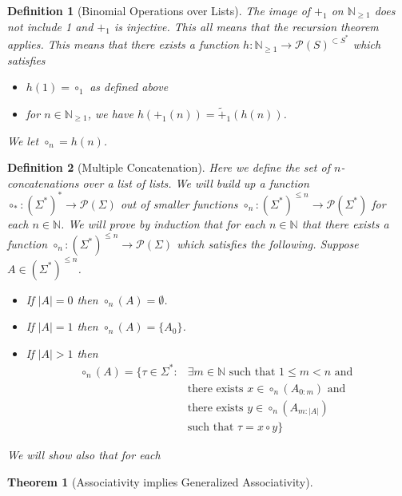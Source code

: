 \documentclass[12pt]{article}
\theoremstyle{break}
\newtheorem{definition}{Definition}[section]
\theoremstyle{break}
\newtheorem{theorem}{Theorem}[section]
\theoremstyle{break}
\theoremstyle{break}
\theoremstyle{break}
\newtheorem{informal definition}[definition]{Informal Definition}
\theoremstyle{break}
\newtheorem{informal theorem}[theorem]{Informal Theorem}
\newcommand{\mc}[1]{\mathcal{#1}}
\newcommand{\natnum}[0]{\mathbb{N}}
\begin{document}
\begin{definition}[Binomial Operations over Lists]
		The image of $+_1$ on $\mathbb{N}_{\ge 1}$ does not include 1 and $+_1$ is injective.
		This all means that the recursion theorem applies.
		This means that there exists a function $h: \mathbb{N}_{\ge 1} \to \mathcal{P}(S)^{\subset S^*}$ which satisfies
		\begin{itemize}
			\item{$h(1) = \circ_1$ as defined above}
			\item{for $n \in \mathbb{N}_{\ge 1}$, we have $h(+_1(n)) = \tilde{+}_1(h(n))$.}
		\end{itemize}
		
		We let $\circ_n = h(n)$.
		
	\end{definition}
	
	\begin{definition}[Multiple Concatenation]
		Here we define the set of $n$-concatenations over a list of lists.
		We will build up a function $\circ_*:(\Sigma^*)^* \to \mc{P}(\Sigma)$ out of smaller functions $\circ_n:(\Sigma^*)^{\le n} \to \mc{P}(\Sigma^*)$ for each $n \in \natnum$.
		We will prove by induction that for each $n\in \natnum$ that there exists a function $\circ_n:(\Sigma^*)^{\le n} \to \mc{P}(\Sigma)$ which satisfies the following.
		Suppose $A \in (\Sigma^*)^{\le n}$.
		
		\begin{itemize}
			\item{If $|A| = 0$ then $\circ_n(A) = \emptyset$.}
			\item{If $|A| = 1$ then $\circ_n(A) = \{A_0\}$.}
			\item{If $|A| > 1$ then
				\begin{align*}
					\circ_n(A) = \{\tau \in \Sigma^*:& \exists m \in \mathbb{N} \text{ such that } 1 \le m < n \text{ and }\\
					& \text{there exists } x \in \circ_n(A_{0:m}) \text{ and  }\\
					& \text{there exists } y \in \circ_n(A_{m:|A|})\\
					& \text{such that } \tau = x \circ y\}
			\end{align*}}
		\end{itemize}
		
		We will show also that for each
	\end{definition}
	
	
	\begin{theorem}[Associativity implies Generalized Associativity]
	\end{theorem}
	
	
\end{document}
